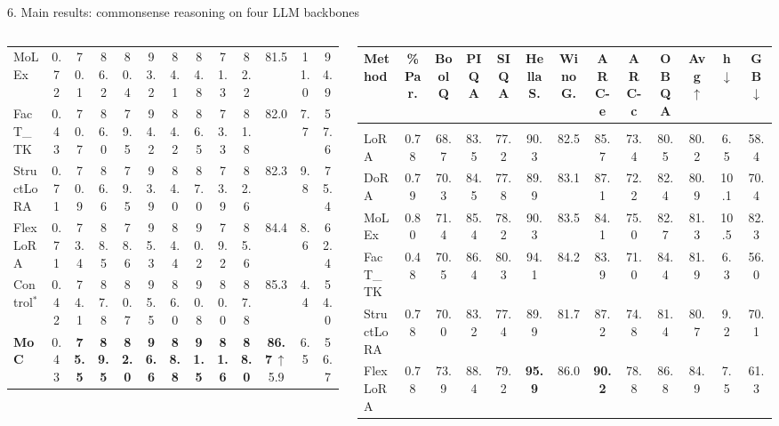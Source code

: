 \documentclass[final]{beamer}
\newlength{\widewidth}
\newcommand{\up}[1]{\,{\color{mocup}\scriptsize$\uparrow$#1}}
\begin{document}
\begin{frame}[t]
\begin{columns}[t]
\begin{column}{\widewidth}
\begin{block}{6. Main results: commonsense reasoning on four LLM backbones}
\begin{table}
\begin{columns}[t,totalwidth=\linewidth]
\begin{column}{0.495\linewidth}
\begin{tabular}{@{}l c cccccccc >{\columncolor{neuripsrule!30}}c cc@{}}
            MoLEx & 0.72 & 70.1 & 86.2 & 80.4 & 93.2 & 84.1 & 84.8 & 71.3 & 82.2 & 81.5 & 11.0 & 94.9 \\
            FacT\_TK & 0.43 & 70.7 & 86.0 & 79.5 & 94.2 & 84.2 & 86.5 & 73.3 & 81.8 & 82.0 & 7.7 & 57.6 \\
            StructLoRA & 0.71 & 70.9 & 86.6 & 79.5 & 93.9 & 84.0 & 87.0 & 73.9 & 82.6 & 82.3 & 9.8 & 75.4 \\
            FlexLoRA & 0.71 & 73.4 & 88.5 & 78.6 & 95.3 & 84.4 & 90.2 & 79.2 & 85.6 & 84.4 & 8.6 & 62.4 \\
            Control$^{*}$ & 0.42 & 74.1 & 87.8 & 80.7 & 95.5 & 86.0 & 90.8 & 80.0 & 87.8 & 85.3 & 4.4 & 54.0 \\
            \rowcolor{mocrow}\textbf{MoC} & 0.43 & \textbf{75.5} & \textbf{89.5} & \textbf{82.0} & \textbf{96.6} & \textbf{88.8} & \textbf{91.5} & \textbf{81.6} & \textbf{88.0} & \textbf{86.7}\up{5.9} & 6.5 & 56.7 \\
            \bottomrule
          \end{tabular}
        \end{column}
        \begin{column}{0.495\linewidth}
          \centering
          \begin{tabular}{@{}l c cccccccc >{\columncolor{neuripsrule!30}}c cc@{}}
            \toprule
            \textbf{Method} & \textbf{\%Par.} & \textbf{BoolQ} & \textbf{PIQA} & \textbf{SIQA} & \textbf{HellaS.} & \textbf{WinoG.} & \textbf{ARC-e} & \textbf{ARC-c} & \textbf{OBQA} & \textbf{Avg$\uparrow$} & \textbf{h$\downarrow$} & \textbf{GB$\downarrow$} \\
            \midrule
            \rowcolor{grouprow}\multicolumn{13}{l}{\textbf{Mistralv3-7B}} \\
            LoRA & 0.78 & 68.7 & 83.5 & 77.2 & 90.3 & 82.5 & 85.7 & 73.4 & 80.5 & 80.2 & 6.5 & 58.4 \\
            DoRA & 0.79 & 70.3 & 84.5 & 77.8 & 89.9 & 83.1 & 87.1 & 72.2 & 82.4 & 80.9 & 10.1 & 70.4 \\
            MoLEx & 0.80 & 71.4 & 85.4 & 78.2 & 90.3 & 83.5 & 84.1 & 75.0 & 82.7 & 81.3 & 10.5 & 82.3 \\
            FacT\_TK & 0.48 & 70.5 & 86.4 & 80.3 & 94.1 & 84.2 & 83.9 & 71.0 & 84.4 & 81.9 & 6.3 & 56.0 \\
            StructLoRA & 0.78 & 70.0 & 83.2 & 77.4 & 89.9 & 81.7 & 87.2 & 74.8 & 81.4 & 80.7 & 9.2 & 70.1 \\
            FlexLoRA & 0.78 & 73.9 & 88.4 & 79.2 & \textbf{95.9} & 86.0 & \textbf{90.2} & 78.8 & 86.8 & 84.9 & 7.5 & 61.3 \\

\end{tabular}
\end{column}
\end{columns}
\end{table}
\end{block}
\end{column}
\end{columns}
\end{frame}
\end{document}
